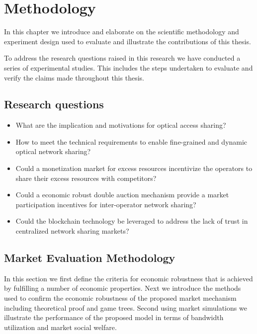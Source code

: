 \chapter*{Methodology}
In this chapter we introduce and elaborate on the scientific methodology and experiment design used to evaluate and illustrate the contributions of this thesis.

To address the research questions raised in this research we have conducted a series of experimental studies. This includes the steps undertaken to evaluate and verify the claims made throughout this thesis. 

\section{Research questions}
\begin{itemize}
\item What are the implication and motivations for optical access sharing?

\item How to meet the technical requirements to enable fine-grained and dynamic optical network sharing?

\item Could a monetization market for excess resources incentivize the operators to share their excess resources with competitors?

\item Could a economic robust double auction mechanism provide a market participation incentives for inter-operator network sharing?

\item Could the blockchain technology be leveraged to address the lack of trust in centralized network sharing markets?



\end{itemize}

\section{Market Evaluation Methodology}
In this section we first define the criteria for economic robustness that is achieved by fulfilling a number of economic properties. Next we introduce the methods used to confirm the economic robustness of the proposed market mechanism including theoretical proof and game trees. Second using market simulations we illustrate the performance of the proposed model in terms of bandwidth utilization and market social welfare.


